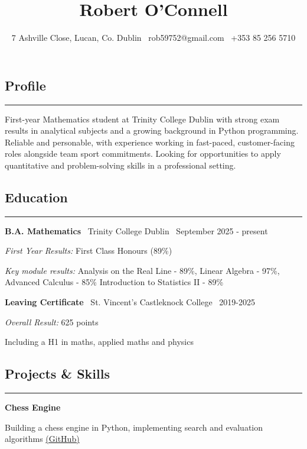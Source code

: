 \documentclass{article}
\title{\textbf{Robert O'Connell}}
\author{7 Ashville Close, Lucan, Co. Dublin \textbar \ rob59752@gmail.com \textbar \ +353 85 256 5710}
\date{}
\begin{document}
\maketitle

\subsection*{Profile}
\hrule
\vspace{2mm}

First-year Mathematics student at Trinity College Dublin with strong exam results in analytical subjects and a
growing background in Python programming. Reliable and personable, with experience working in fast-paced,
customer-facing roles alongside team sport commitments. Looking for opportunities to apply quantitative and
problem-solving skills in a professional setting.


\subsection*{Education}
\hrule
\vspace{2mm}

\textbf{B.A. Mathematics} \textbar \ Trinity College Dublin \textbar \ September 2025 - present

\vspace{1mm}
\emph{First Year Results:} First Class Honours (89\%)

\emph{Key module results:} Analysis on the Real Line - 89\%, Linear Algebra - 97\%, Advanced Calculus - 85\% Introduction to Statistics II - 89\%


\vspace{4mm}
\textbf{Leaving Certificate} \textbar \ St. Vincent's Castleknock College \textbar \ 2019-2025

\emph{Overall Result:} 625 points

Including a H1 in maths, applied maths and physics

\subsection*{Projects \& Skills}
\hrule
\vspace{2mm}

\textbf{Chess Engine}

Building a chess engine in Python, implementing search and evaluation algorithms \href{https://github.com/rober45627/Chess_Engine}{(GitHub)}
\\
\end{document}
